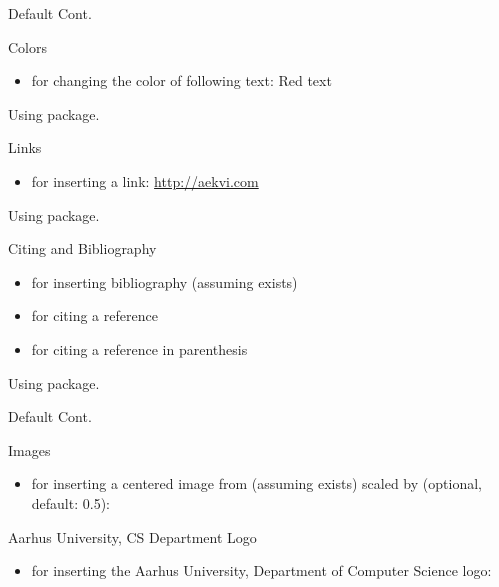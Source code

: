 \begin{frame}{Default Cont.}
  \begin{block}{Colors}
    \begin{itemize}
      \item {} for changing the color of following text: {\color{red} Red text}
    \end{itemize}
    Using  package.
  \end{block}
  \begin{block}{Links}
    \begin{itemize}
      \item {} for inserting a link: \url{http://aekvi.com}
    \end{itemize}
    Using  package.
  \end{block}
  \begin{block}{Citing and Bibliography}
    \begin{itemize}
      \item {} for inserting bibliography (assuming  exists)
      \item {} for citing a reference
      \item {} for citing a reference in parenthesis
    \end{itemize}
    Using  package.
  \end{block}
\end{frame}

\begin{frame}{Default Cont.}
  \begin{block}{Images}
    \begin{itemize}
      \item {} for inserting a centered image from  (assuming  exists) scaled by  (optional, default: 0.5):
      
    \end{itemize}
  \end{block}
  \begin{block}{Aarhus University, CS Department Logo}
    \begin{itemize}
      \item {} for inserting the Aarhus University, Department of Computer Science logo:
      
      \csau
    \end{itemize}
  \end{block}
\end{frame}

